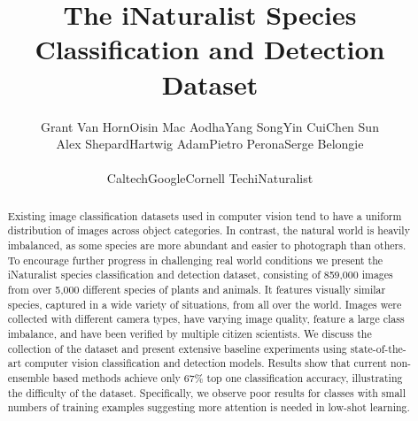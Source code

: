 \documentclass[10pt,twocolumn,letterpaper]{article}
\begin{document}
\title{The iNaturalist Species Classification and Detection Dataset}

\author{Grant Van Horn\hspace{15pt}Oisin Mac Aodha\hspace{15pt}Yang Song\hspace{15pt}Yin Cui\hspace{15pt}Chen Sun\\Alex Shepard\hspace{15pt}Hartwig Adam\hspace{15pt}Pietro Perona\hspace{15pt}Serge Belongie\\
\\
Caltech\hspace{20pt}Google\hspace{20pt}Cornell Tech\hspace{20pt}iNaturalist}



\maketitle
\thispagestyle{empty}



\begin{abstract}
Existing image classification datasets used in computer vision tend to have a uniform distribution of images across object categories. 
In contrast, the natural world is heavily imbalanced, as some species are more abundant and easier to photograph than others. 
To encourage further progress in challenging real world conditions we present the iNaturalist species classification and detection dataset, consisting of 859,000 images from over 5,000 different species of plants and animals.
It features visually similar species, captured in a wide variety of situations, from all over the world.
Images were collected with different camera types, have varying image quality, feature a large class imbalance, and have been verified by multiple citizen scientists. We discuss the collection of the dataset and present extensive baseline experiments using state-of-the-art computer vision classification and detection models.
Results show that current non-ensemble based methods achieve only 67\% top one classification accuracy, illustrating the difficulty of the dataset.
Specifically, we observe poor results for classes with small numbers of training examples suggesting more attention is needed in low-shot learning. 

\end{abstract}
\end{document}
